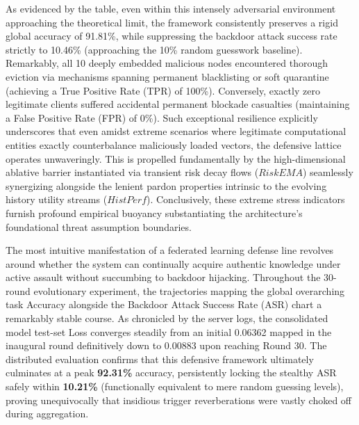 \documentclass[runningheads]{llncs}
\begin{document}
As evidenced by the table, even within this intensely adversarial environment approaching the theoretical limit, the framework consistently preserves a rigid global accuracy of 91.81\%, while suppressing the backdoor attack success rate strictly to 10.46\% (approaching the 10\% random guesswork baseline). Remarkably, all 10 deeply embedded malicious nodes encountered thorough eviction via mechanisms spanning permanent blacklisting or soft quarantine (achieving a True Positive Rate (TPR) of 100\%). Conversely, exactly zero legitimate clients suffered accidental permanent blockade casualties (maintaining a False Positive Rate (FPR) of 0\%). Such exceptional resilience explicitly underscores that even amidst extreme scenarios where legitimate computational entities exactly counterbalance maliciously loaded vectors, the defensive lattice operates unwaveringly. This is propelled fundamentally by the high-dimensional ablative barrier instantiated via transient risk decay flows ($RiskEMA$) seamlessly synergizing alongside the lenient pardon properties intrinsic to the evolving history utility streams ($HistPerf$). Conclusively, these extreme stress indicators furnish profound empirical buoyancy substantiating the architecture's foundational threat assumption boundaries.

The most intuitive manifestation of a federated learning defense line revolves around whether the system can continually acquire authentic knowledge under active assault without succumbing to backdoor hijacking. Throughout the 30-round evolutionary experiment, the trajectories mapping the global overarching task Accuracy alongside the Backdoor Attack Success Rate (ASR) chart a remarkably stable course. As chronicled by the server logs, the consolidated model test-set Loss converges steadily from an initial 0.06362 mapped in the inaugural round definitively down to 0.00883 upon reaching Round 30. The distributed evaluation confirms that this defensive framework ultimately culminates at a peak \textbf{92.31\%} accuracy, persistently locking the stealthy ASR safely within \textbf{10.21\%} (functionally equivalent to mere random guessing levels), proving unequivocally that insidious trigger reverberations were vastly choked off during aggregation.
\end{document}
